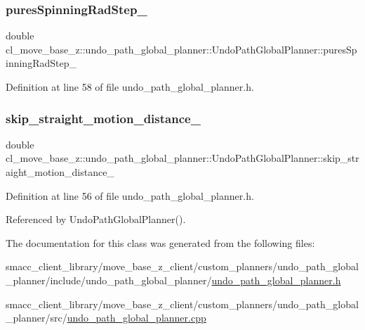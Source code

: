 \subsubsection{\texorpdfstring{pures\+Spinning\+Rad\+Step\+\_\+}{puresSpinningRadStep\_}}
{\footnotesize\ttfamily double cl\+\_\+move\+\_\+base\+\_\+z\+::undo\+\_\+path\+\_\+global\+\_\+planner\+::\+Undo\+Path\+Global\+Planner\+::pures\+Spinning\+Rad\+Step\+\_\+\hspace{0.3cm}{\ttfamily [private]}}



Definition at line 58 of file undo\+\_\+path\+\_\+global\+\_\+planner.\+h.

\mbox{\label{classcl__move__base__z_1_1undo__path__global__planner_1_1UndoPathGlobalPlanner_a9cb4fb49c952deeb77eb1cb9648d122f}} 
\subsubsection{\texorpdfstring{skip\+\_\+straight\+\_\+motion\+\_\+distance\+\_\+}{skip\_straight\_motion\_distance\_}}
{\footnotesize\ttfamily double cl\+\_\+move\+\_\+base\+\_\+z\+::undo\+\_\+path\+\_\+global\+\_\+planner\+::\+Undo\+Path\+Global\+Planner\+::skip\+\_\+straight\+\_\+motion\+\_\+distance\+\_\+\hspace{0.3cm}{\ttfamily [private]}}



Definition at line 56 of file undo\+\_\+path\+\_\+global\+\_\+planner.\+h.



Referenced by Undo\+Path\+Global\+Planner().



The documentation for this class was generated from the following files\+:\begin{DoxyCompactItemize}
\item 
smacc\+\_\+client\+\_\+library/move\+\_\+base\+\_\+z\+\_\+client/custom\+\_\+planners/undo\+\_\+path\+\_\+global\+\_\+planner/include/undo\+\_\+path\+\_\+global\+\_\+planner/\hyperlink{undo__path__global__planner_8h}{undo\+\_\+path\+\_\+global\+\_\+planner.\+h}\item 
smacc\+\_\+client\+\_\+library/move\+\_\+base\+\_\+z\+\_\+client/custom\+\_\+planners/undo\+\_\+path\+\_\+global\+\_\+planner/src/\hyperlink{undo__path__global__planner_8cpp}{undo\+\_\+path\+\_\+global\+\_\+planner.\+cpp}\end{DoxyCompactItemize}
